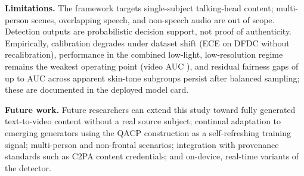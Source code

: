 \textbf{Limitations.} The framework targets single-subject talking-head
content; multi-person scenes, overlapping speech, and non-speech audio are out
of scope. Detection outputs are probabilistic decision support, not proof of
authenticity. Empirically, calibration degrades under dataset shift
(ECE  on DFDC without recalibration), performance in the
combined low-light, low-resolution regime remains the weakest operating
point (video AUC ), and residual fairness gaps of up to
 AUC across apparent skin-tone subgroups persist after
balanced sampling; these are documented in the deployed model card.

\textbf{Future work.} Future researchers can extend this study toward fully
generated text-to-video content without a real source subject; continual
adaptation to emerging generators using the QACP construction as a
self-refreshing training signal; multi-person and non-frontal scenarios;
integration with provenance standards such as C2PA content credentials; and
on-device, real-time variants of the detector.
